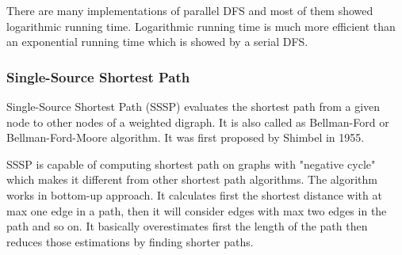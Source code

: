 \documentclass[journal,twoside,web]{ieeecolor}
\begin{document}
There are many implementations of parallel DFS and most of them showed logarithmic running time\cite{38}. Logarithmic running time is much more efficient than an exponential running time which is showed by a serial DFS.

\subsubsection{Single-Source Shortest Path}
Single-Source Shortest Path (SSSP) evaluates the shortest path from a given node to other nodes of a weighted digraph. It is also called as Bellman-Ford or Bellman-Ford-Moore algorithm\cite{41}. It was first proposed by Shimbel\cite{42} in 1955.

SSSP is capable of computing shortest path on graphs with "negative cycle" which makes it different from other shortest path algorithms. The algorithm works in bottom-up approach. It calculates first the shortest distance with at max one edge in a path, then it will consider edges with max two edges in the path and so on. It basically overestimates first the length of the path then reduces those estimations by finding shorter paths. 
\end{document}
